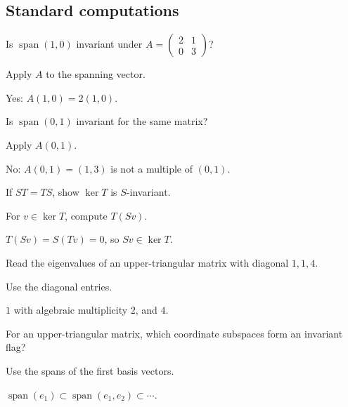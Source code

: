 \subsection*{Standard computations}

\begin{exercise}\label{exr:i10-expand-01}
Is \(\operatorname{span}(1,0)\) invariant under \(A=\begin{pmatrix}2&1\\0&3\end{pmatrix}\)?
\end{exercise}
\begin{hint}
Apply \(A\) to the spanning vector.
\end{hint}
\begin{solution}
Yes: \(A(1,0)=2(1,0)\).
\end{solution}

\begin{exercise}\label{exr:i10-expand-02}
Is \(\operatorname{span}(0,1)\) invariant for the same matrix?
\end{exercise}
\begin{hint}
Apply \(A(0,1)\).
\end{hint}
\begin{solution}
No: \(A(0,1)=(1,3)\) is not a multiple of \((0,1)\).
\end{solution}

\begin{exercise}\label{exr:i10-expand-03}
If \(ST=TS\), show \(\ker T\) is \(S\)-invariant.
\end{exercise}
\begin{hint}
For \(v\in\ker T\), compute \(T(Sv)\).
\end{hint}
\begin{solution}
\(T(Sv)=S(Tv)=0\), so \(Sv\in\ker T\).
\end{solution}

\begin{exercise}\label{exr:i10-expand-04}
Read the eigenvalues of an upper-triangular matrix with diagonal \(1,1,4\).
\end{exercise}
\begin{hint}
Use the diagonal entries.
\end{hint}
\begin{solution}
\(1\) with algebraic multiplicity \(2\), and \(4\).
\end{solution}

\begin{exercise}[Flag]\label{exr:i10-expand-05}
For an upper-triangular matrix, which coordinate subspaces form an invariant flag?
\end{exercise}
\begin{hint}
Use the spans of the first basis vectors.
\end{hint}
\begin{solution}
\(\operatorname{span}(e_1)\subset\operatorname{span}(e_1,e_2)\subset\cdots\).
\end{solution}

